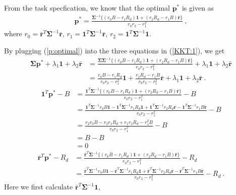 \documentclass[12pt]{ftec2101}
\newcommand{\matr}[1]{\mathbf{#1}}
\newcommand{\vect}[1]{\mathbf{#1}}
\begin{document}
\noindent
From the task specfication, we know that the optimal $\vect{p}^{*}$ is given as
\begin{align}
    \vect{p}^{*} = \frac{\matr{\Sigma}^{-1}\{(r_0 B-r_1 R_d)\vect{1}+(r_2 R_d- r_1 B)\bar{\vect{r}}\}}{r_0 r_2 - r_1^2} \ ,
    \label{p:optimal}
\end{align}
where $r_0 = \bar{\vect{r}}^T \matr{\Sigma}^{-1} \bar{\vect{r}}$, $r_1 = \vect{1}^T \matr{\Sigma}^{-1} \bar{\vect{r}}$, $r_2 = \vect{1}^T \matr{\Sigma}^{-1} \vect{1}$.

\noindent
By plugging (\ref{p:optimal}) into the three equations in (\ref{KKT:1}), we get
\begin{align}
    \matr{\Sigma} \vect{p}^{*} +\lambda_1 \vect{1} + \lambda_2 \bar{\vect{r}}&= \frac{\matr{\Sigma}\matr{\Sigma}^{-1}\{(r_0 B - r_1 R_d)\vect{1}+(r_2 R_d - r_1 B)\bar{\vect{r}}\}}{r_0 r_2 -r_1^2} + \lambda_1 \vect{1} + \lambda_2 \bar{\vect{r}} \\
    &= \frac{r_0 B-r_1 R_d}{r_0 r_2 -r_1^2}\vect{1}+\frac{r_2 R_d - r_1 B}{r_0 r_2 -r_1^2}\bar{\vect{r}} + \lambda_1 \vect{1} +\lambda_2 \bar{\vect{r}}\ .
    \label{KKT:in:1}
\end{align}
\begin{align}
    \vect{1}^T \vect{p}^{*} - B &= \frac{\vect{1}^T\matr{\Sigma}^{-1}\{(r_0 B-r_1 R_d)\vect{1}+(r_2 R_d - r_1 B)\bar{\vect{r}}\}}{r_0 r_2 - r_1^2}- B \\
    & = \frac{\vect{1}^T\matr{\Sigma}^{-1}r_0 B \vect{1}-\vect{1}^T\matr{\Sigma}^{-1}r_1 R_d \vect{1}+\vect{1}^T\matr{\Sigma}^{-1}r_2 R_d \bar{\vect{r}}-\vect{1}^T \matr{\Sigma}^{-1} r_1 B \bar{\vect{r}}}{r_0 r_2 -r_1^2} - B \\
    & = \frac{r_2 r_0 B - r_2 r_1 R_d + r_1 r_2 R_d -r_1^2 B}{r_0 r_2 -r_1^2} - B \\
    & = B - B \\
    & = 0
    \label{KKT:in:2}
\end{align}
\begin{align}
    \bar{\vect{r}}^T \vect{p}^{*} -R_d &= \frac{\bar{\vect{r}}^T\matr{\Sigma}^{-1}\{(r_0 B-r_1 R_d)\vect{1}+(r_2 R_d - r_1 B)\bar{\vect{r}}\}}{r_0 r_2 - r_1^2}- R_d \\
    &= \frac{\bar{\vect{r}}^T\matr{\Sigma}^{-1}r_0 B \vect{1}-\bar{\vect{r}}^T\matr{\Sigma}^{-1}r_1 R_d \vect{1}+\bar{\vect{r}}^T\matr{\Sigma}^{-1}r_2 R_d \bar{\vect{r}}-\bar{\vect{r}}^T \matr{\Sigma}^{-1} r_1 B \bar{\vect{r}}}{r_0 r_2 -r_1^2} - R_d \ .
    \label{KKT:in:3:half}
\end{align}
Here we first calculate $\bar{\vect{r}}^T \matr{\Sigma}^{-1} \vect{1}$,
\end{document}
